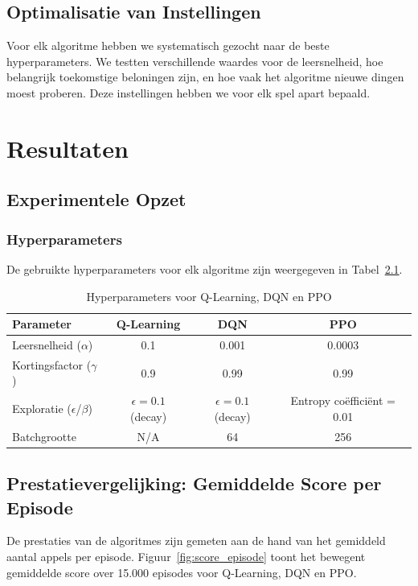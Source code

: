 \documentclass[a4paper,10pt]{report}
\begin{document}
\section{Optimalisatie van Instellingen}
Voor elk algoritme hebben we systematisch gezocht naar de beste
hyperparameters. We testten verschillende waardes voor de leersnelheid, hoe
belangrijk toekomstige beloningen zijn, en hoe vaak het algoritme nieuwe dingen
moest proberen. Deze instellingen hebben we voor elk spel apart bepaald.

\chapter{Resultaten}

\section{Experimentele Opzet}

\subsection{Hyperparameters}
De gebruikte hyperparameters voor elk algoritme zijn weergegeven in
Tabel~\ref{tab:hyperparameters}.

\begin{table}[ht]
    \centering
    \caption{Hyperparameters voor Q-Learning, DQN en PPO}
    \label{tab:hyperparameters}
    \begin{tabular}{|l|c|c|c|}
        \hline
        \textbf{Parameter}              & \textbf{Q-Learning}      & \textbf{DQN}             & \textbf{PPO}               \\ \hline
        Leersnelheid ($\alpha$)         & 0.1                      & 0.001                    & 0.0003                     \\ \hline
        Kortingsfactor ($\gamma$)       & 0.9                      & 0.99                     & 0.99                       \\ \hline
        Exploratie ($\epsilon$/$\beta$) & $\epsilon = 0.1$ (decay) & $\epsilon = 0.1$ (decay) & Entropy coëfficiënt = 0.01 \\ \hline
        Batchgrootte                    & N/A                      & 64                       & 256                        \\ \hline
    \end{tabular}
\end{table}

\section{Prestatievergelijking: Gemiddelde Score per Episode}
De prestaties van de algoritmes zijn gemeten aan de hand van het gemiddeld
aantal appels per episode. Figuur~\ref{fig:score_episode} toont het bewegent
gemiddelde score over 15.000 episodes voor Q-Learning, DQN en PPO.
\end{document}
